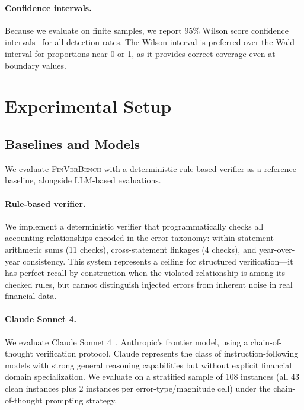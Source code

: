 \documentclass[11pt]{article}
\newcommand{\benchmark}{\textsc{FinVerBench}}
\begin{document}
\paragraph{Confidence intervals.}
Because we evaluate on finite samples, we report 95\% Wilson score confidence intervals~\citep{wilson1927} for all detection rates.
The Wilson interval is preferred over the Wald interval for proportions near 0 or 1, as it provides correct coverage even at boundary values.

\section{Experimental Setup}
\label{sec:setup}

\subsection{Baselines and Models}
\label{sec:models}

We evaluate \benchmark{} with a deterministic rule-based verifier as a reference baseline, alongside LLM-based evaluations.

\paragraph{Rule-based verifier.}
We implement a deterministic verifier that programmatically checks all accounting relationships encoded in the error taxonomy: within-statement arithmetic sums (11 checks), cross-statement linkages (4 checks), and year-over-year consistency.
This system represents a ceiling for structured verification---it has perfect recall by construction when the violated relationship is among its checked rules, but cannot distinguish injected errors from inherent noise in real financial data.

\paragraph{Claude Sonnet 4.}
We evaluate Claude Sonnet 4~\citep{claude2025}, Anthropic's frontier model, using a chain-of-thought verification protocol.
Claude represents the class of instruction-following models with strong general reasoning capabilities but without explicit financial domain specialization.
We evaluate on a stratified sample of 108 instances (all 43 clean instances plus 2 instances per error-type/magnitude cell) under the chain-of-thought prompting strategy.
\end{document}
